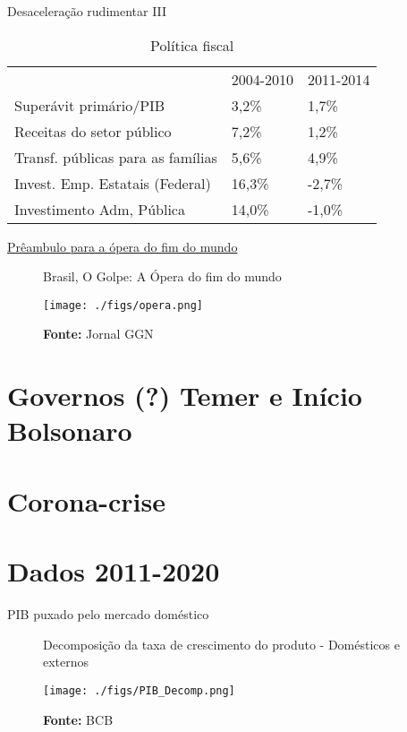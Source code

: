 \documentclass[presentation]{beamer}
\begin{document}
\begin{frame}[label={sec:org0d3102e}]{Desaceleração rudimentar III}
\begin{table}[htbp]
\caption{Política fiscal}
\centering
\begin{tabular}{lll}
\hline
 & 2004-2010 & 2011-2014\\
Superávit primário/PIB & 3,2\% & 1,7\%\\
Receitas do setor público & 7,2\% & 1,2\%\\
Transf. públicas para as famílias & 5,6\% & 4,9\%\\
Invest. Emp. Estatais (Federal) & 16,3\% & -2,7\%\\
Investimento Adm, Pública & 14,0\% & -1,0\%\\
\hline
\end{tabular}
\end{table}
\end{frame}


\begin{frame}[label={sec:org634d435}]{\href{https://www.causaoperaria.org.br/brasil-o-golpe-a-opera-do-fim-do-mundo-artista-retrata-o-golpe-de-estado-no-pais/}{Prêambulo para a ópera do fim do mundo}}
\begin{figure}[htb]
\centering
\caption{Brasil, O Golpe: A Ópera do fim do mundo} 
\texttt{[image: ./figs/opera.png]}
\caption*{\textbf{Fonte:} Jornal GGN}
\end{figure}
\end{frame}

\section{Governos (?) Temer e Início Bolsonaro}
\label{sec:org64e7e08}

\section{Corona-crise}
\label{sec:org8030c3b}
\section{Dados 2011-2020}
\label{sec:org59ed6e2}



\begin{frame}[label={sec:orgc0b5249}]{PIB puxado pelo mercado doméstico}
\begin{figure}[htb]
\centering
\caption{Decomposição da taxa de crescimento do produto - Domésticos e externos} 
\texttt{[image: ./figs/PIB\_Decomp.png]}
\label{fig:cycles}
\caption*{\textbf{Fonte:} BCB}
\end{figure}
\end{frame}
\end{document}
